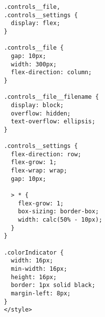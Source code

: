 \begin{lstlisting}[language=vue]
.controls__file,
.controls__settings {
  display: flex;
}

.controls__file {
  gap: 10px;
  width: 300px;
  flex-direction: column;
}

.controls__file__filename {
  display: block;
  overflow: hidden;
  text-overflow: ellipsis;
}

.controls__settings {
  flex-direction: row;
  flex-grow: 1;
  flex-wrap: wrap;
  gap: 10px;

  > * {
    flex-grow: 1;
    box-sizing: border-box;
    width: calc(50% - 10px);
  }
}

.colorIndicator {
  width: 16px;
  min-width: 16px;
  height: 16px;
  border: 1px solid black;
  margin-left: 8px;
}
</style>  
\end{lstlisting}
